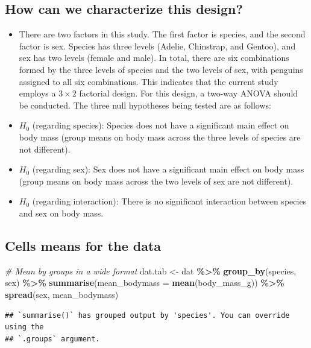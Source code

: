 \documentclass[
]{book}
\newenvironment{Shaded}{\begin{snugshade}}{\end{snugshade}}
\newcommand{\AttributeTok}[1]{\textcolor[rgb]{0.13,0.29,0.53}{#1}}
\newcommand{\CommentTok}[1]{\textcolor[rgb]{0.56,0.35,0.01}{\textit{#1}}}
\newcommand{\FunctionTok}[1]{\textcolor[rgb]{0.13,0.29,0.53}{\textbf{#1}}}
\newcommand{\NormalTok}[1]{#1}
\newcommand{\OtherTok}[1]{\textcolor[rgb]{0.56,0.35,0.01}{#1}}
\newcommand{\SpecialCharTok}[1]{\textcolor[rgb]{0.81,0.36,0.00}{\textbf{#1}}}
\begin{document}
\subsection{How can we characterize this design?}\label{how-can-we-characterize-this-design}

\begin{itemize}
\item
  There are two factors in this study. The first factor is species, and the second factor is sex. Species has three levels (Adelie, Chinstrap, and Gentoo), and sex has two levels (female and male). In total, there are six combinations formed by the three levels of species and the two levels of sex, with penguins assigned to all six combinations. This indicates that the current study employs a \(3 \times 2\) factorial design. For this design, a two-way ANOVA should be conducted. The three null hypotheses being tested are as follows:
\item
  \(H_0\) (regarding species): Species does not have a significant main effect on body mass (group means on body mass across the three levels of species are not different).
\item
  \(H_0\) (regarding sex): Sex does not have a significant main effect on body mass (group means on body mass across the two levels of sex are not different).
\item
  \(H_0\) (regarding interaction): There is no significant interaction between species and sex on body mass.
\end{itemize}

\subsection{Cells means for the data}\label{cells-means-for-the-data}

\begin{Shaded}
\begin{Highlighting}[]
\CommentTok{\# Mean by groups in a wide format}
\NormalTok{dat.tab }\OtherTok{\textless{}{-}}\NormalTok{ dat }\SpecialCharTok{\%\textgreater{}\%} \FunctionTok{group\_by}\NormalTok{(species, sex) }\SpecialCharTok{\%\textgreater{}\%}
  \FunctionTok{summarise}\NormalTok{(}\AttributeTok{mean\_bodymass =} \FunctionTok{mean}\NormalTok{(body\_mass\_g)) }\SpecialCharTok{\%\textgreater{}\%}
  \FunctionTok{spread}\NormalTok{(sex, mean\_bodymass)}
\end{Highlighting}
\end{Shaded}

\begin{verbatim}
## `summarise()` has grouped output by 'species'. You can override using the
## `.groups` argument.
\end{verbatim}
\end{document}

